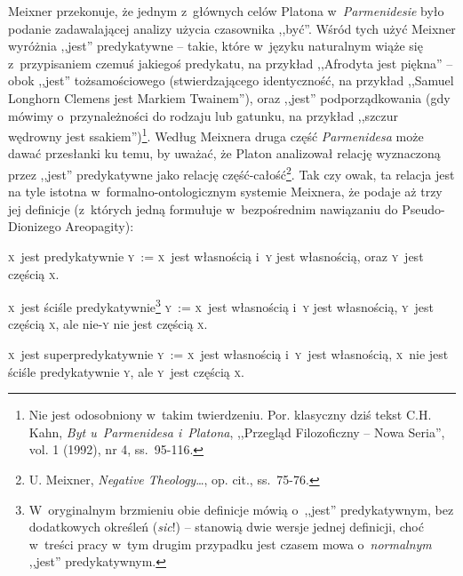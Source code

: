 Meixner przekonuje, że jednym z~głównych celów Platona w~\textit{Parmenidesie} było podanie zadawalającej analizy użycia czasownika ,,być''. Wśród tych użyć Meixner wyróżnia ,,jest'' predykatywne -- takie, które w~języku naturalnym wiąże się z~przypisaniem czemuś jakiegoś predykatu, na przykład ,,Afrodyta jest piękna'' -- obok ,,jest'' tożsamościowego (stwierdzającego identyczność, na przykład ,,Samuel Longhorn Clemens jest Markiem Twainem''), oraz ,,jest'' podporządkowania (gdy mówimy o~przynależności do rodzaju lub gatunku, na przykład ,,szczur wędrowny jest ssakiem'')\footnote{Nie jest odosobniony w~takim twierdzeniu. Por. klasyczny dziś tekst C.H. Kahn, \textit{Byt u~Parmenidesa i~Platona}, ,,Przegląd Filozoficzny -- Nowa Seria'', vol. 1 (1992), nr 4, ss.~95-116.}. Według Meixnera druga część \textit{Parmenidesa} może dawać przesłanki ku temu, by uważać, że Platon analizował relację wyznaczoną przez ,,jest'' predykatywne jako relację część-całość\footnote{U. Meixner, \textit{Negative Theology}\ldots, op. cit., ss.~75-76.}. Tak czy owak, ta relacja jest na tyle istotna w~formalno-ontologicznym systemie Meixnera, że podaje aż trzy jej definicje (z~których jedną formułuje w~bezpośrednim nawiązaniu do Pseudo-Dionizego Areopagity):
\begin{defin}\label{mei-def3}
\textsc{x}~jest predykatywnie \textsc{y}~:= \textsc{x}~jest własnością i~\textsc{y} jest własnością, oraz \textsc{y}~jest częścią \textsc{x}.
\end{defin}
\begin{defin}\label{mei-def4}
\textsc{x}~jest ściśle predykatywnie\footnote{W~oryginalnym brzmieniu obie definicje mówią o~,,jest'' predykatywnym, bez dodatkowych określeń (\textit{\textit{sic}}!) -- stanowią dwie wersje jednej definicji, choć w~treści pracy w~tym drugim przypadku jest czasem mowa o~\textit{normalnym} ,,jest'' predykatywnym.} \textsc{y}~:= \textsc{x}~jest własnością i~\textsc{y} jest własnością, \textsc{y}~jest częścią \textsc{x}, ale nie-\textsc{y} nie jest częścią \textsc{x}.
\end{defin}
\begin{defin}\label{mei-def5}
\textsc{x}~jest superpredykatywnie \textsc{y}~:= \textsc{x}~jest własnością i~\textsc{y}~jest własnością, \textsc{x}~nie jest ściśle predykatywnie \textsc{y}, ale \textsc{y}~jest częścią \textsc{x}.
\end{defin}
%
%
%

